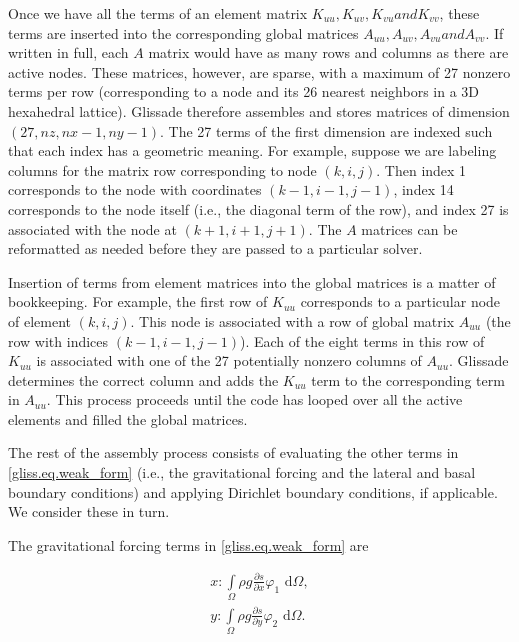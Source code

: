 Once we have all the terms of an element matrix $K_{uu}, K_{uv}, K_{vu} and K_{vv}$, these terms
are inserted into the corresponding global matrices $A_{uu}, A_{uv}, A_{vu} and A_{vv}$.
If written in full, each $A$ matrix would have as many rows and columns as there are active nodes.
These matrices, however, are sparse, with a maximum of 27 nonzero terms per row (corresponding to
a node and its 26 nearest neighbors in a 3D hexahedral lattice).
Glissade therefore assembles and stores matrices of dimension $(27,nz,nx-1,ny-1)$.
The 27 terms of the first dimension are indexed such that each index has a geometric meaning.
For example, suppose we are labeling columns for the matrix row corresponding to node $(k,i,j)$. 
Then index 1 corresponds to the node with coordinates $(k-1,i-1,j-1)$, index 14 corresponds to the
node itself (i.e., the diagonal term of the row), and index 27 is associated with the node at $(k+1,i+1,j+1)$.
The $A$ matrices can be reformatted as needed before they are passed to a particular solver. 

Insertion of terms from element matrices into the global matrices is a matter of bookkeeping.
For example, the first row of $K_{uu}$ corresponds to a particular node of element $(k,i,j)$.
This node is associated with a row of global matrix $A_{uu}$ (the row
with indices $(k-1,i-1,j-1)$).  Each of the eight terms in this row of $K_{uu}$ is associated with one of
the 27 potentially nonzero columns of $A_{uu}$.  Glissade determines the correct column
and adds the $K_{uu}$ term to the corresponding term in $A_{uu}$.  This process proceeds
until the code has looped over all the active elements and filled the global matrices.

The rest of the assembly process consists of evaluating the other terms in \eqref{gliss.eq.weak_form}
(i.e., the gravitational forcing and the lateral and basal boundary conditions) and applying Dirichlet boundary conditions,
if applicable. We consider these in turn.

The gravitational forcing terms in \eqref{gliss.eq.weak_form} are

\begin{equation}
  \label{gliss.eq.gravity_forcing}
  \begin{split}
    x: \int\limits_{\Omega } {\rho g\frac{\partial s}{\partial x}} {{\varphi }_{1}}\text{ d}\Omega, \\
    y: \int\limits_{\Omega } {\rho g\frac{\partial s}{\partial y}} {{\varphi }_{2}}\text{ d}\Omega. \\
  \end{split}
\end{equation}

